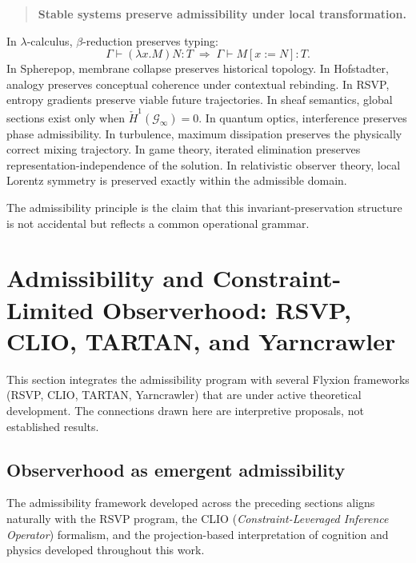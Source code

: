 \documentclass[12pt, a4paper]{article}
\theoremstyle{plain}
\theoremstyle{definition}
\theoremstyle{remark}
\begin{document}
\begin{quote}
  \textbf{Stable systems preserve admissibility under local
  transformation.}
\end{quote}

In $\lambda$-calculus, $\beta$-reduction preserves typing:
\[
  \Gamma \vdash (\lambda x.M)N : T
  \;\Rightarrow\;
  \Gamma \vdash M[x:=N] : T.
\]
In Spherepop, membrane collapse preserves historical topology.
In Hofstadter, analogy preserves conceptual coherence under
contextual rebinding.
In RSVP, entropy gradients preserve viable future trajectories.
In sheaf semantics, global sections exist only when
$\check{H}^1(\mathcal{G}_\infty) = 0$.
In quantum optics, interference preserves phase admissibility.
In turbulence, maximum dissipation preserves the physically correct
mixing trajectory.
In game theory, iterated elimination preserves
representation-independence of the solution.
In relativistic observer theory, local Lorentz symmetry is preserved
exactly within the admissible domain.

The admissibility principle is the claim that this invariant-preservation
structure is not accidental but reflects a common operational grammar.

\section{Admissibility and Constraint-Limited Observerhood:
  RSVP, CLIO, TARTAN, and Yarncrawler}
\label{sec:rsvp-synthesis}

\begin{speculative}
  This section integrates the admissibility program with several
  Flyxion frameworks (RSVP, CLIO, TARTAN, Yarncrawler) that are
  under active theoretical development.
  The connections drawn here are interpretive proposals, not
  established results.
\end{speculative}

\subsection{Observerhood as emergent admissibility}

The admissibility framework developed across the preceding sections
aligns naturally with the RSVP program, the CLIO
(\emph{Constraint-Leveraged Inference Operator}) formalism, and the
projection-based interpretation of cognition and physics developed
throughout this work.
\end{document}
